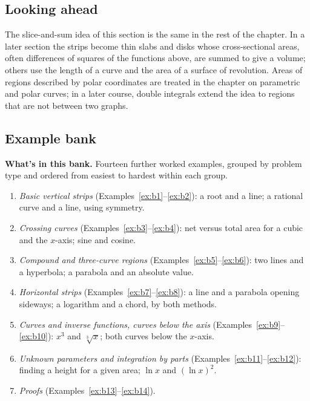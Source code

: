 \documentclass[11pt]{article}
\begin{document}
\subsection*{Looking ahead}

The slice-and-sum idea of this section is the same in the rest of the chapter. In a later section the strips become thin slabs and disks whose cross-sectional areas, often differences of squares of the functions above, are summed to give a volume; others use the length of a curve and the area of a surface of revolution. Areas of regions described by polar coordinates are treated in the chapter on parametric and polar curves; in a later course, double integrals extend the idea to regions that are not between two graphs.

\subsection*{Example bank}

\textbf{What's in this bank.} Fourteen further worked examples, grouped by problem type and ordered from easiest to hardest within each group.
\begin{enumerate}[nosep]
  \item \emph{Basic vertical strips} (Examples~\ref{ex:b1}--\ref{ex:b2}): a root and a line; a rational curve and a line, using symmetry.
  \item \emph{Crossing curves} (Examples~\ref{ex:b3}--\ref{ex:b4}): net versus total area for a cubic and the $x$-axis; sine and cosine.
  \item \emph{Compound and three-curve regions} (Examples~\ref{ex:b5}--\ref{ex:b6}): two lines and a hyperbola; a parabola and an absolute value.
  \item \emph{Horizontal strips} (Examples~\ref{ex:b7}--\ref{ex:b8}): a line and a parabola opening sideways; a logarithm and a chord, by both methods.
  \item \emph{Curves and inverse functions, curves below the axis} (Examples~\ref{ex:b9}--\ref{ex:b10}): $x^3$ and $\sqrt[3]{x}$; both curves below the $x$-axis.
  \item \emph{Unknown parameters and integration by parts} (Examples~\ref{ex:b11}--\ref{ex:b12}): finding a height for a given area; $\ln x$ and $(\ln x)^2$.
  \item \emph{Proofs} (Examples~\ref{ex:b13}--\ref{ex:b14}).
\end{enumerate}
\end{document}
